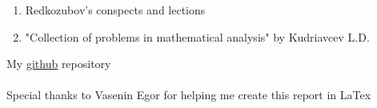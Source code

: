\documentclass{article}
\begin{document}
\begin{enumerate}
\item Redkozubov's conspects and lections
\item "Collection of problems in mathematical analysis" by Kudriavcev L.D.
\end{enumerate}
My \href{https://github.com/Baranov-V-V/Differentiator}{\underline{github}} repository\\\\Special thanks to Vasenin Egor for helping me create this report in LaTex
\end{document}
